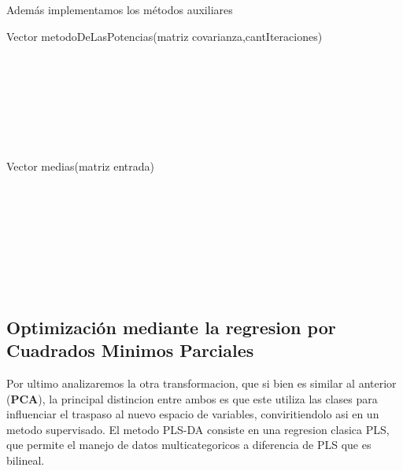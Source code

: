 Además implementamos los métodos auxiliares

\begin{algorithm}
    \begin{algorithmic}[1]\parskip=2mm
        \caption{Vector metodoDeLasPotencias(matriz covarianza,cantIteraciones)}
        \\
        \\
        \\
        \\
        \\
        \\
    \end{algorithmic}
\end{algorithm}



\begin{algorithm}
    \begin{algorithmic}[1]\parskip=2mm
        \caption{Vector medias(matriz entrada)}
        \\
        \\
        \\
        \\
        \\
        \\
        \\
    \end{algorithmic}
\end{algorithm}

\subsection {Optimización mediante la regresion por Cuadrados Minimos Parciales}
Por ultimo analizaremos la otra transformacion, que si bien es similar al anterior (\textbf{PCA}), la principal distincion entre ambos es que este utiliza las clases para influenciar el traspaso al nuevo espacio de variables, conviritiendolo asi en un metodo supervisado.
El metodo PLS-DA consiste en una regresion clasica PLS, que permite el manejo de datos multicategoricos a diferencia de PLS que es bilineal.

